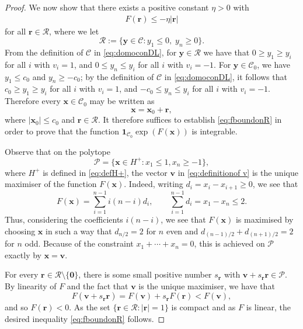 \documentclass[10pt,a4paper]{amsart}
\newcommand{\x}{\mathbf{x}}
\newcommand{\y}{\mathbf{y}}
\begin{document}
\begin{proof}
    We now show that there exists a positive constant $\eta > 0$ with
    \begin{align}\label{eq:fboundonR}
         F(\mathbf{r}) \le - \eta | \mathbf{r} |
    \end{align}
    for all $\mathbf{r} \in \mathcal{R}$, where we let 
    \[ \mathcal{R}:= \{\y \in \mathcal{C}: y_1 \le 0, \; y_n \ge 0 \} .
    \]
     From the definition of $\mathcal{C}$ in \eqref{eq:domoconDL}, for $\y \in \mathcal{R}$ we have that
     $0 \ge y_1 \ge y_i$ for all $i$ with $v_i =1$, and  $0 \le y_n \le y_i$ for all $i$ with $v_i =-1$.
    For $\y \in \mathcal{C}_0$, we have $y_1 \le c_0$ and $y_n \ge -c_0$; by the definition of $\mathcal{C}$ in \eqref{eq:domoconDL}, it follows that 
    $c_0 \ge y_1 \ge y_i$ for all $i$ with $v_i =1$, and  $-c_0 \le y_n \le y_i$ for all $i$ with $v_i =-1$. Therefore every $\x \in \mathcal{C}_0$ may be written as 
    \[
    \x = \x_0 + \mathbf{r}, 
    \]
where $|\x_0| \le c_0$ and $\mathbf{r} \in \mathcal{R}$.
    It therefore suffices
    to establish \eqref{eq:fboundonR}  in order to prove that the function $\mathbf{1}_{\mathcal{C}_0} \exp(F(\x))$ is integrable.
    
    Observe that on the polytope 
    \[
    \mathcal{P} = \{ 
    \mathbf{x} \in H^+: x_1 \le 1, x_n \ge -1 
    \},
    \]
    where $H^{+}$ is defined in \eqref{eq:defH+},
    the vector $\mathbf{v}$  in \eqref{eq:definitionof v} is the unique maximiser of the function $F(\x)$. 
    Indeed, writing $d_i = x_{i} - x_{i+1} \ge 0$, we see that 
    \[
    F(\x) = \sum_{i=1}^{n-1} i(n-i)d_i, \qquad \sum_{i=1}^{n-1} d_i = x_1 - x_n \le 2.
    \]
    Thus, considering the coefficients $i(n-i)$, we see that $F(\x)$ is maximised by  choosing $\x$ in such a way that $d_{n/2} = 2$ for $n$ even and $d_{(n-1)/2}+d_{(n+1)/2}=2$ for $n$ odd. Because of the constraint $ x_1 + \cdots + x_n = 0$, this is achieved on $\mathcal{P}$ exactly by $\x=\mathbf{v}$. 

    For every $\mathbf{r} \in \mathcal{R} \setminus \{\mathbf{0}\}$, there is some small positive number $s_\mathbf{r}$ with $\mathbf{v} + s_\mathbf{r}\mathbf{r} \in \mathcal{P}$. By linearity of $F$ and the fact that $\mathbf{v}$ is the unique maximiser, we have that 
    \[
    F(\mathbf{v} + s_\mathbf{r}  \mathbf{r}) = F(\mathbf{v}) + s_\mathbf{r} F(\mathbf{r}) < F(\mathbf{v}), 
    \]
    and so $F(\mathbf{r}) < 0$. As the set $\{ \mathbf{r} \in \mathcal{R}: | \mathbf{r}| =1 \}$ is compact and as $F$ is linear, the desired inequality  \eqref{eq:fboundonR} follows.


\end{proof}
\end{document}
